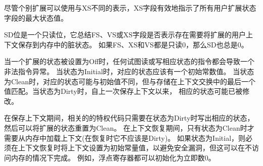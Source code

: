 \begin{commentary}
尽管个别扩展可以使用与XS不同的表示，XS字段有效地指示了所有用户扩展状态字段的最大状态值。
\end{commentary}



SD位是一个只读位，它总结FS、VS或XS字段是否表示存在需要将扩展的用户上下文保存到内存中的脏状态。
如果FS、XS和VS都是只读0，那么SD也总是0。


当一个扩展的状态被设置为Off时，任何试图读或写相应状态的指令都会导致一个非法指令异常。
当状态为Initial时，对应的状态应该有一个初始常数值。
当状态为Clean时，对应的状态可能与初始值不同，但与存储在上下文交换中的最后一个值匹配。当状态为Dirty时，自上一次保存上下文以来，
相应的状态可能已被修改。


在保存上下文期间，相关的的特权代码只需要在状态为Dirty时写出相应的状态，然后可以将扩展的状态重置为Clean。
在上下文恢复期间，只有状态为Clean时才需要从内存中加载上下文(在恢复时它不应该是Dirty)。
如果状态为Initial，则必须在上下文恢复时将上下文设置为初始常量值，以避免安全漏洞，但这可以在不访问内存的情况下完成。
例如，浮点寄存器都可以初始化为立即数0。

